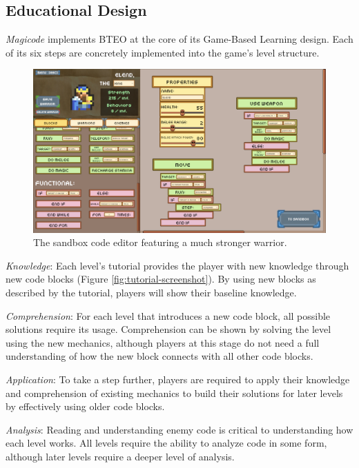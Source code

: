 \documentclass[10pt,twocolumn]{article}
\begin{document}
\subsection{Educational Design}
\textit{Magicode} implements BTEO at the core of its Game-Based Learning design. Each of its six steps are concretely implemented into the game’s level structure.

\begin{figure}
    \centering
    \includegraphics[width=\linewidth]{images/screenshots/elend_editor.png}
    \caption{The sandbox code editor featuring a much stronger warrior.}
    \label{fig:sandbox-warrior-screenshot}
\end{figure}

\textit{Knowledge}: Each level’s tutorial provides the player with new knowledge through new code blocks (Figure \ref{fig:tutorial-screenshot}). By using new blocks as described by the tutorial, players will show their baseline knowledge.


\textit{Comprehension}: For each level that introduces a new code block, all possible solutions require its usage. Comprehension can be shown by solving the level using the new mechanics, although players at this stage do not need a full understanding of how the new block connects with all other code blocks.

\textit{Application}: To take a step further, players are required to apply their knowledge and comprehension of existing mechanics to build their solutions for later levels by effectively using older code blocks.

\textit{Analysis}: Reading and understanding enemy code is critical to understanding how each level works. All levels require the ability to analyze code in some form, although later levels require a deeper level of analysis.
\end{document}
